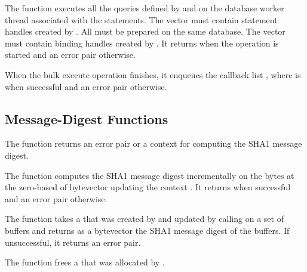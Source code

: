 \begin{function}
\end{function}

The  function executes all the queries
defined by  and  on the database worker
thread associated with the statements. The vector 
must contain statement handles created by
. All  must be prepared
on the same database. The vector  must contain binding
handles created by . It returns
 when the operation is started and an error pair otherwise.

When the bulk execute operation finishes, it enqueues the callback
list , where  is
 when successful and an error pair otherwise.

\subsection {Message-Digest Functions}

\begin{function}
\end{function}

The  function returns an error pair
or a context for computing the SHA1 message digest.

\begin{function}
\end{function}

The  function computes the SHA1 message digest
incrementally on the  bytes at the zero-based 
of bytevector  updating the context .
It returns  when successful and an error pair otherwise.

\begin{function}
\end{function}

The  function takes a  that was created by
 and updated by calling  on a set
of buffers and returns as a bytevector the SHA1 message digest of the buffers.
If unsuccessful, it returns an error pair.

\begin{function}
\end{function}

The  function frees a 
that was allocated by .
